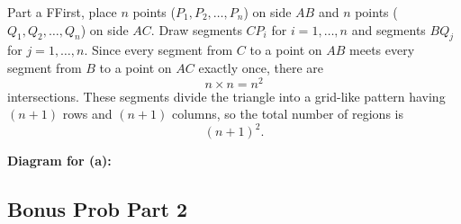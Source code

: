 \documentclass{report}
\begin{document}
\begin{RemarkWithLily}{Part a}
  FFirst, place \(n\) points (\(P_1, P_2, \dots, P_n\)) on side \(AB\) and \(n\) points (\(Q_1, Q_2, \dots, Q_n\)) on side \(AC\).  
  Draw segments \(CP_i\) for \(i=1,\dots,n\) and segments \(BQ_j\) for \(j=1,\dots,n\).  
  Since every segment from \(C\) to a point on \(AB\) meets every segment from \(B\) to a point on \(AC\) exactly once, there are
  \[
  n \times n = n^2
  \]
  intersections. These segments divide the triangle into a grid-like pattern having \((n+1)\) rows and \((n+1)\) columns, so the total number of regions is
  \[
  (n+1)^2.
  \]

  \bigskip

  \textbf{Diagram for (a):}

  \bigskip

  \begin{center}
  \end{center}
\end{RemarkWithLily}


\newpage

\subsection*{Bonus Prob Part 2}
\end{document}
